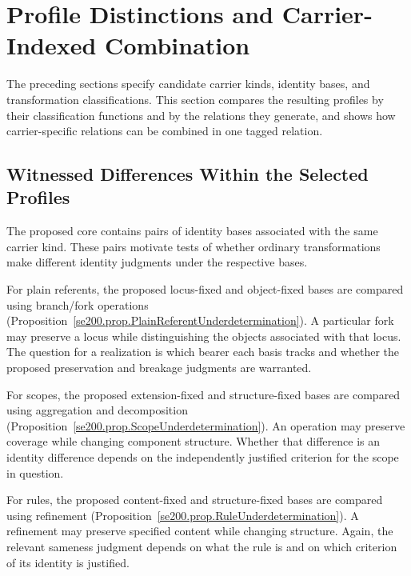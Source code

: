 
\section{Profile Distinctions and Carrier-Indexed Combination}
\label{sec:distinctions}

The preceding sections specify candidate carrier kinds,
identity bases, and transformation classifications.
This section compares the resulting profiles by their classification
functions and by the relations they generate, and shows how
carrier-specific relations can be combined in one tagged relation.



\subsection{Witnessed Differences Within the Selected Profiles}
\label{subsec:witnessed_splits}

The proposed core contains pairs of identity bases associated
with the same carrier kind.
These pairs motivate tests of whether ordinary transformations make
different identity judgments under the respective bases.

For plain referents, the proposed locus-fixed and object-fixed bases
are compared using branch/fork operations
(Proposition~\ref{se200.prop.PlainReferentUnderdetermination}).
A particular fork may preserve a locus while distinguishing the objects
associated with that locus.
The question for a realization is which bearer each basis tracks and
whether the proposed preservation and breakage judgments are warranted.

For scopes, the proposed extension-fixed and structure-fixed bases
are compared using aggregation and decomposition
(Proposition~\ref{se200.prop.ScopeUnderdetermination}).
An operation may preserve coverage while changing component structure.
Whether that difference is an identity difference depends on the
independently justified criterion for the scope in question.

For rules, the proposed content-fixed and structure-fixed bases
are compared using refinement
(Proposition~\ref{se200.prop.RuleUnderdetermination}).
A refinement may preserve specified content while changing structure.
Again, the relevant sameness judgment depends on what the rule is
and on which criterion of its identity is justified.

